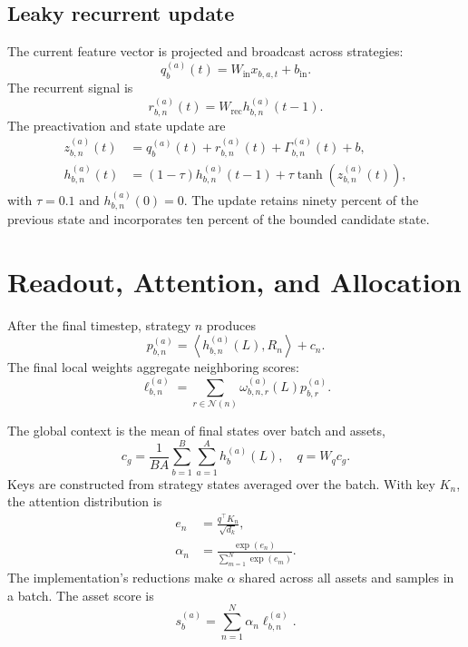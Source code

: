 \documentclass[10pt,a4paper,twocolumn]{article}
\begin{document}
\subsection{Leaky recurrent update}
The current feature vector is projected and broadcast across strategies:
\begin{equation}
q_b^{(a)}(t)=W_{\mathrm{in}}x_{b,a,t}+b_{\mathrm{in}}.
\end{equation}
The recurrent signal is
\begin{equation}
r_{b,n}^{(a)}(t)=W_{\mathrm{rec}}h_{b,n}^{(a)}(t-1).
\end{equation}
The preactivation and state update are
\begin{align}
z_{b,n}^{(a)}(t)&=q_b^{(a)}(t)+r_{b,n}^{(a)}(t)+\Gamma_{b,n}^{(a)}(t)+b,\\
h_{b,n}^{(a)}(t)&=(1-\tau)h_{b,n}^{(a)}(t-1)+\tau\tanh(z_{b,n}^{(a)}(t)),
\end{align}
with $\tau=0.1$ and $h_{b,n}^{(a)}(0)=0$. The update retains ninety percent of the previous state and incorporates ten percent of the bounded candidate state.

\section{Readout, Attention, and Allocation}
After the final timestep, strategy $n$ produces
\begin{equation}
p_{b,n}^{(a)}=\left\langle h_{b,n}^{(a)}(L),R_n\right\rangle+c_n.
\end{equation}
The final local weights aggregate neighboring scores:
\begin{equation}
\ell_{b,n}^{(a)}=\sum_{r\in\mathcal{N}(n)}\omega_{b,n,r}^{(a)}(L)p_{b,r}^{(a)}.
\end{equation}

The global context is the mean of final states over batch and assets,
\begin{equation}
c_g=\frac{1}{BA}\sum_{b=1}^{B}\sum_{a=1}^{A}h_b^{(a)}(L),\quad q=W_qc_g.
\end{equation}
Keys are constructed from strategy states averaged over the batch. With key $K_n$, the attention distribution is
\begin{align}
e_n&=\frac{q^\top K_n}{\sqrt{d_k}},\\
\alpha_n&=\frac{\exp(e_n)}{\sum_{m=1}^{N}\exp(e_m)}.
\end{align}
The implementation's reductions make $\alpha$ shared across all assets and samples in a batch. The asset score is
\begin{equation}
s_b^{(a)}=\sum_{n=1}^{N}\alpha_n\ell_{b,n}^{(a)}.
\end{equation}
\end{document}
